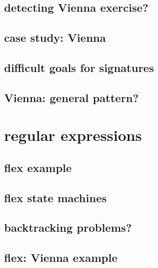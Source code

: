 \subsection{detecting Vienna exercise?}


\subsection{case study: Vienna}


\subsection{difficult goals for signatures}


\subsection{Vienna: general pattern?}


\section{regular expressions}


\subsection{flex example}


\subsection{flex state machines}




\subsection{backtracking problems?}




\subsection{flex: Vienna example}



